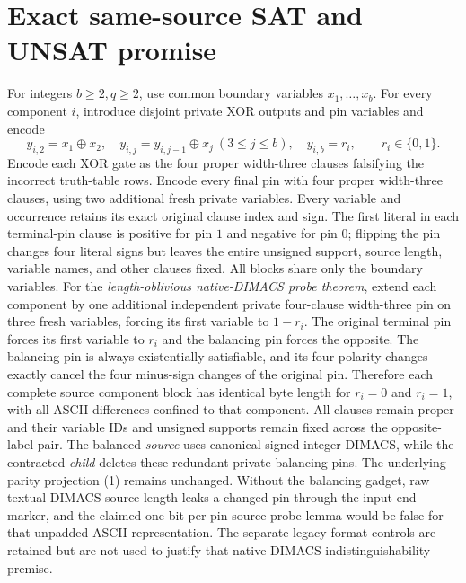 \documentclass[11pt]{article}
\begin{document}
\section{Exact same-source SAT and UNSAT promise}
For integers $b\ge2,q\ge2$, use common boundary variables $x_1,\dots,x_b$. For every component $i$, introduce disjoint private XOR outputs and pin variables and encode
\[
 y_{i,2}=x_1\oplus x_2,\quad
 y_{i,j}=y_{i,j-1}\oplus x_j\ (3\le j\le b),\quad
 y_{i,b}=r_i,\qquad r_i\in\{0,1\}.
\]
Encode each XOR gate as the four proper width-three clauses falsifying the incorrect truth-table rows. Encode every final pin with four proper width-three clauses, using two additional fresh private variables. Every variable and occurrence retains its exact original clause index and sign. The first literal in each terminal-pin clause is positive for pin $1$ and negative for pin $0$; flipping the pin changes four literal signs but leaves the entire unsigned support, source length, variable names, and other clauses fixed. All blocks share only the boundary variables. For the \emph{length-oblivious native-DIMACS probe theorem}, extend each component by one additional independent private four-clause width-three pin on three fresh variables, forcing its first variable to $1-r_i$. The original terminal pin forces its first variable to $r_i$ and the balancing pin forces the opposite. The balancing pin is always existentially satisfiable, and its four polarity changes exactly cancel the four minus-sign changes of the original pin. Therefore each complete source component block has identical byte length for $r_i=0$ and $r_i=1$, with all ASCII differences confined to that component. All clauses remain proper and their variable IDs and unsigned supports remain fixed across the opposite-label pair. The balanced \emph{source} uses canonical signed-integer DIMACS, while the contracted \emph{child} deletes these redundant private balancing pins. The underlying parity projection (1) remains unchanged. Without the balancing gadget, raw textual DIMACS source length leaks a changed pin through the input end marker, and the claimed one-bit-per-pin source-probe lemma would be false for that unpadded ASCII representation. The separate legacy-format controls are retained but are not used to justify that native-DIMACS indistinguishability premise.
\end{document}
